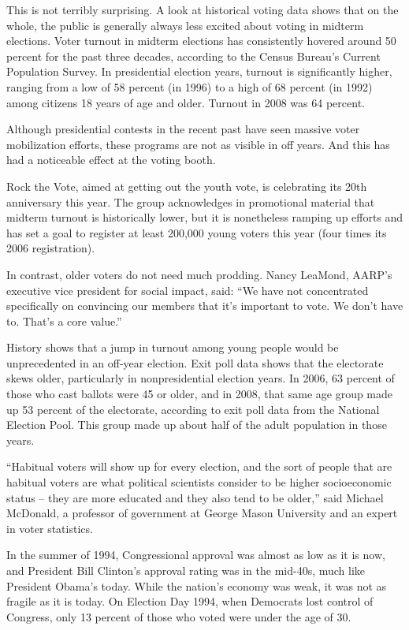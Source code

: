 ﻿\documentclass[12pt]{article}
\begin{document}
This is not terribly surprising. A look at historical voting data shows that on the whole, the
public is generally always less excited about voting in midterm elections. Voter turnout in midterm
elections has consistently hovered around 50 percent for the past three decades, according to the
Census Bureau's Current Population Survey. In presidential election years, turnout is significantly
higher, ranging from a low of 58 percent (in 1996) to a high of 68 percent (in 1992) among citizens
18 years of age and older. Turnout in 2008 was 64 percent.

Although presidential contests in the recent past have seen massive voter mobilization efforts,
these programs are not as visible in off years. And this has had a noticeable effect at the voting
booth.

Rock the Vote, aimed at getting out the youth vote, is celebrating its 20th anniversary this year.
The group acknowledges in promotional material that midterm turnout is historically lower, but it is
nonetheless ramping up efforts and has set a goal to register at least 200,000 young voters this
year (four times its 2006 registration).

In contrast, older voters do not need much prodding. Nancy LeaMond, AARP's executive vice president
for social impact, said: ``We have not concentrated specifically on convincing our members that it's
important to vote. We don't have to. That's a core value.''

History shows that a jump in turnout among young people would be unprecedented in an off-year
election. Exit poll data shows that the electorate skews older, particularly in nonpresidential
election years. In 2006, 63 percent of those who cast ballots were 45 or older, and in 2008, that
same age group made up 53 percent of the electorate, according to exit poll data from the National
Election Pool. This group made up about half of the adult population in those years.

``Habitual voters will show up for every election, and the sort of people that are habitual voters
are what political scientists consider to be higher socioeconomic status -- they are more educated
and they also tend to be older,'' said Michael McDonald, a professor of government at George Mason
University and an expert in voter statistics.

In the summer of 1994, Congressional approval was almost as low as it is now, and President Bill
Clinton's approval rating was in the mid-40s, much like President Obama's today. While the nation's
economy was weak, it was not as fragile as it is today. On Election Day 1994, when Democrats lost
control of Congress, only 13 percent of those who voted were under the age of 30.
\end{document}
